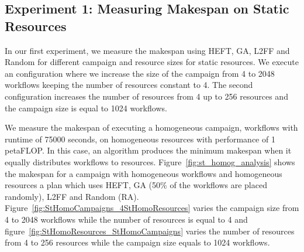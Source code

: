 \subsection{Experiment 1: Measuring Makespan on Static Resources}

In our first experiment, we measure the makespan using HEFT, GA, L2FF and
Random for different campaign and resource sizes for static resources. We
execute an configuration where we increase the size of the campaign from 4 to
2048 workflows keeping the number of resources constant to 4. The second
configuration increases the number of resources from 4 up to 256 resources and
the campaign size is equal to 1024 workflows.


We measure the makespan of executing a homogeneous campaign, workflows with
runtime of 75000 seconds, on homogeneous resources with performance of 1
petaFLOP. In this case, an algorithm produces the minimum makespan when it
equally distributes workflows to resources. Figure~\ref{fig:st_homog_analysis}
shows the makespan for a campaign with homogeneous workflows and homogeneous
resources a plan which uses HEFT, GA (50\% of the workflows are placed
randomly), L2FF and Random (RA).
Figure~\ref{fig:StHomoCampaigns_4StHomoResources} varies the campaign size
from 4 to 2048 workflows while the number of resources is equal to 4 and
figure~\ref{fig:StHomoResources_StHomoCampaigns} varies the number of
resources from 4 to 256 resources while the campaign size equals to 1024
workflows.

